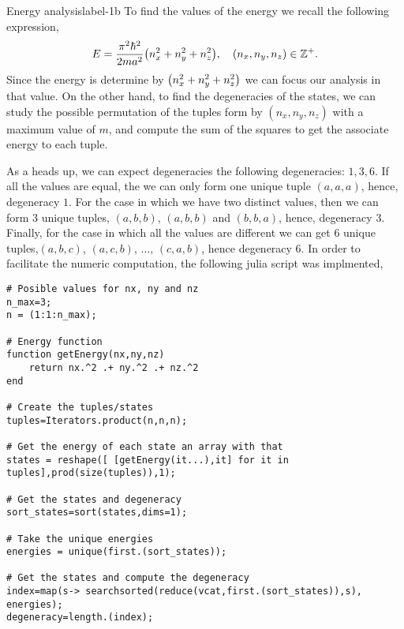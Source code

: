 \documentclass[../main.tex]{subfiles}
\begin{document}
\begin{sol}{Energy analysis}{label-1b}
    To find the values of the energy we recall the following expression,
    \begin{gather*}
        E=\frac{\pi^2\hbar^2}{2ma^2}\qty(n_x^2+n_y^2+n_z^2), \quad \qty(n_x,n_y,n_z)\in\mathbb{Z}^+.
    \end{gather*}
    Since the energy is determine by $\qty(n_x^2+n_y^2+n_z^2)$ we can focus our analysis in that value.
    On the other hand, to find the degeneracies of the states, we can study the possible permutation of the tuples form by $(n_x,n_y,n_z)$ with a maximum value of $m$, and compute the sum of the squares to get the associate energy to each tuple.
    \vspace{1.5em}

    As a heads up, we can expect degeneracies the following degeneracies: $1,3,6$.
    If all the values are equal, the we can only form one unique tuple $(a,a,a)$, hence, degeneracy $1$.
    For the case in which we have two distinct values, then we can form $3$ unique tuples, $(a,b,b)$, $(a,b,b)$ and $(b,b,a)$, hence, degeneracy $3$.
    Finally, for the case in which all the values are different we can get $6$ unique tuples,$(a,b,c)$, $(a,c,b)$, $\dots$, $(c,a,b)$, hence degeneracy $6$.
    In order to facilitate the numeric computation, the following julia script was implmented,

\begin{lstlisting}
# Posible values for nx, ny and nz
n_max=3;
n = (1:1:n_max);

# Energy function
function getEnergy(nx,ny,nz)
    return nx.^2 .+ ny.^2 .+ nz.^2
end

# Create the tuples/states
tuples=Iterators.product(n,n,n);

# Get the energy of each state an array with that
states = reshape([ [getEnergy(it...),it] for it in tuples],prod(size(tuples)),1);

# Get the states and degeneracy
sort_states=sort(states,dims=1);

# Take the unique energies
energies = unique(first.(sort_states));

# Get the states and compute the degeneracy
index=map(s-> searchsorted(reduce(vcat,first.(sort_states)),s), energies);
degeneracy=length.(index);
 
\end{lstlisting}

\newpage


\end{sol}
\end{document}
